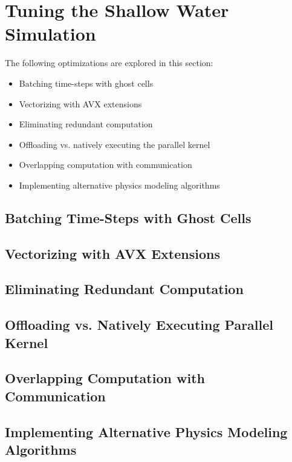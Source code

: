 
\section{Tuning the Shallow Water Simulation}
\label{sec-tune}

The following optimizations are explored in this section:

\begin{itemize}
  \item Batching time-steps with ghost cells
  \item Vectorizing with AVX extensions
  \item Eliminating redundant computation
  \item Offloading vs. natively executing the parallel kernel
  \item Overlapping computation with communication
  \item Implementing alternative physics modeling algorithms
\end{itemize}

\subsection{Batching Time-Steps with Ghost Cells}
\label{sec-tune-batching}

\subsection{Vectorizing with AVX Extensions}
\label{sec-tune-vectorizing}

\subsection{Eliminating Redundant Computation}
\label{sec-tune-eliminating}

\subsection{Offloading vs. Natively Executing Parallel Kernel}
\label{sec-tune-offloading}

\subsection{Overlapping Computation with Communication}
\label{sec-tune-overlapping}

\subsection{Implementing Alternative Physics Modeling Algorithms}
\label{sec-tune-implementing}
